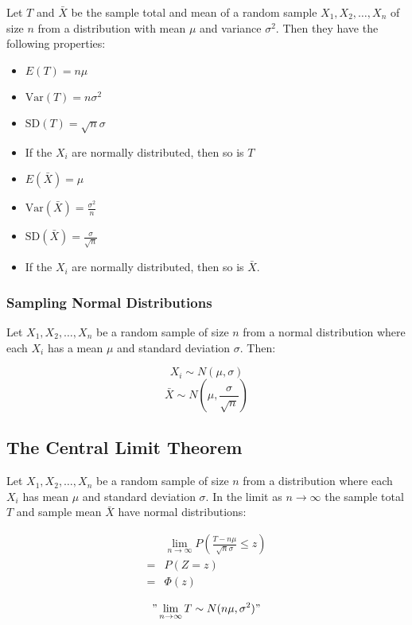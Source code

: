 Let $T$ and $\bar{X}$ be the sample total and mean of a random sample $X_1,X_2,\ldots,X_n$ of size $n$ from a distribution with mean $\mu$ and variance $\sigma^2$.
Then they have the following properties:

\begin{itemize}
    \item $E(T) = n\mu$
    \item $\text{Var}(T)=n\sigma^2$
    \item $\text{SD}(T)=\sqrt{n}\sigma$
    \item If the $X_i$ are normally distributed, then so is $T$
    \item $E(\bar{X}) = \mu$
    \item $\text{Var}(\bar{X}) = \frac{\sigma^2}{n}$
    \item $\text{SD}(\bar{X}) = \frac{\sigma}{\sqrt{n}}$
    \item If the $X_i$ are normally distributed, then so is $\bar{X}$.
\end{itemize}

\subsubsection*{Sampling Normal Distributions}

Let $X_1,X_2,\ldots,X_n$ be a random sample of size $n$ from a normal distribution where each $X_i$ has a mean $\mu$ and standard deviation $\sigma$.
Then:

$$ X_i \sim N(\mu,\sigma) $$
$$ \bar{X} \sim N(\mu,\frac{\sigma}{\sqrt{n}}) $$

\subsection*{The Central Limit Theorem}

Let $X_1,X_2,\ldots,X_n$ be a random sample of size $n$ from a distribution where each $X_i$ has mean $\mu$ and standard deviation $\sigma$. In the limit as $n\to \infty$ the sample total $T$ and sample mean $\bar{X}$ have normal distributions:

\begin{align*}
      & \lim_{n\to\infty} P\left(\frac{T-n\mu}{\sqrt{n} \sigma}\leq z\right) \\
    = & P(Z=z)                                                               \\
    = & \Phi(z)
\end{align*}

$$"\lim_{n\to\infty}T\sim N(n\mu,\sigma^2)"$$

